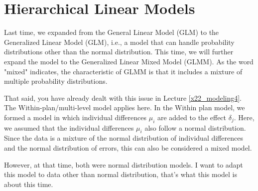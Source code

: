 \documentclass{ltjsbook}
\begin{document}
\VerbatimFootnotes
\chapter{Hierarchical Linear Models}
\label{x25_HLM}
Last time, we expanded from the General Linear Model (GLM) to the Generalized Linear Model (GLM), i.e., a model that can handle probability distributions other than the normal distribution. This time, we will further expand the model to the Generalized Linear Mixed Model (GLMM). As the word "mixed" indicates, the characteristic of GLMM is that it includes a mixture of multiple probability distributions.

That said, you have already dealt with this issue in Lecture \ref{x22_modeling4}. The Within-plan/multi-level model applies here. In the Within plan model, we formed a model in which individual differences $\mu_i$ are added to the effect $\delta_j$. Here, we assumed that the individual differences $\mu_i$ also follow a normal distribution. Since the data is a mixture of the normal distribution of individual differences and the normal distribution of errors, this can also be considered a mixed model.

However, at that time, both were normal distribution models. I want to adapt this model to data other than normal distribution, that's what this model is about this time.
\end{document}
